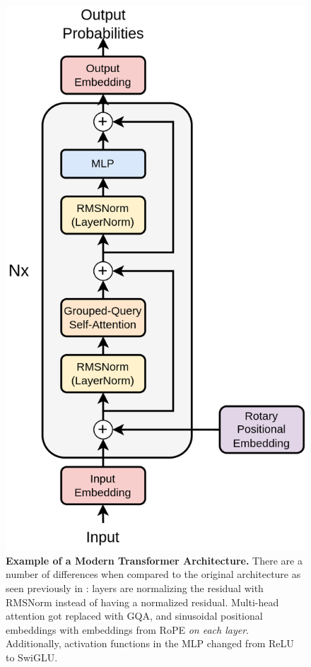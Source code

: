 \begin{figure}[!htb]
    \begin{centering}
        \includegraphics[height=0.4\textheight]{img/modern_transformer}
        \caption[Example of a Modern Transformer Architecture]{\textbf{Example of a Modern Transformer Architecture.} There are a number of differences when compared to the original architecture as seen previously in : layers are normalizing the residual with RMSNorm instead of having a normalized residual. Multi-head attention got replaced with \gls{GQA}, and sinusoidal positional embeddings with embeddings from \gls{RoPE} {\em on each layer}. Additionally, activation functions in the \gls{MLP} changed from \gls{ReLU} to \gls{SwiGLU}.}
        \label{fig:modern_transformer}
    \end{centering}
\end{figure}


